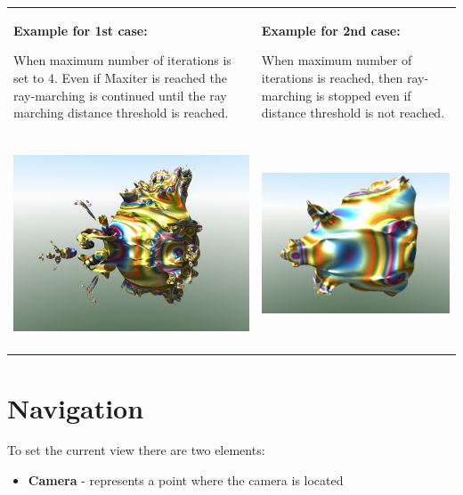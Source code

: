 \begin{longtable}[]{@{}ll@{}}
\toprule
\textbf{Example for 1st case:}

When maximum number of iterations is set to 4. Even if Maxiter is
reached the ray-marching is continued until the ray marching distance
threshold is reached. & \textbf{Example for 2nd case:}

When maximum number of iterations is reached, then ray-marching is
stopped even if distance threshold is not reached.\tabularnewline
\includegraphics[width=3.26929in,height=2.44016in]{img/manual/media/image9.png}
&
\includegraphics[width=3.26890in,height=2.44016in]{img/manual/media/image10.png}\tabularnewline
\bottomrule
\end{longtable}

\section{Navigation}\label{navigation}

To set the current view there are two elements:

\begin{itemize}
\item
  \textbf{Camera} - represents a point where the camera is located
\end{itemize}

